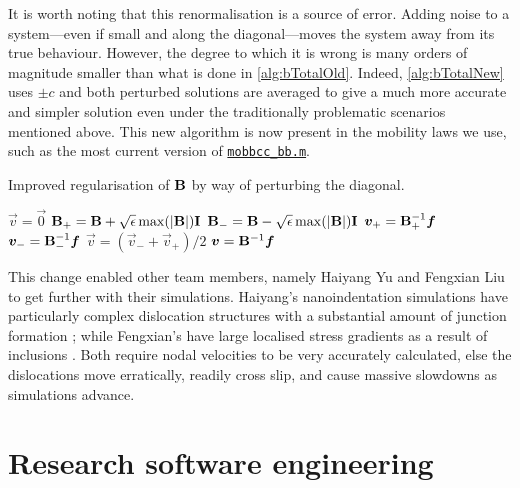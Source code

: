 It is worth noting that this renormalisation is a source of error. Adding noise to a system---even if small and along the diagonal---moves the system away from its true behaviour. However, the degree to which it is wrong is many orders of magnitude smaller than what is done in \cref{alg:bTotalOld}. Indeed, \cref{alg:bTotalNew} uses $\pm c $ and both perturbed solutions are averaged to give a much more accurate and simpler solution even under the traditionally problematic scenarios mentioned above. This new algorithm is now present in the mobility laws we use, such as the most current version of \href{https://github.com/TarletonGroup/EasyDD/blob/372984499dd60136fc7badabd6cee192058d55d9/src/mobbcc_bb1b.m#L199}{\texttt{mobbcc\_bb.m}}.
\begin{algorithm}
  \caption[Dampening the drag matrix inversion singularity.]{Improved regularisation of $\mathbf{B}$ by way of perturbing the diagonal.}
  \label{alg:bTotalNew}
  \begin{algorithmic}
    \State $\vec{v} = \vec{0}$
    \State $\mathbf{B}_+ = \mathbf{B} + \sqrt{\epsilon} \max(\mathbf{\lvert B\rvert}) \mathbf{I}$
    \State $\mathbf{B}_- = \mathbf{B} - \sqrt{\epsilon} \max(\mathbf{\lvert B\rvert}) \mathbf{I}$
    \State $\vec{v}_+ = \mtx{B}_+^{-1} \vec{f}$
    \State $\vec{v}_- = \mtx{B}_-^{-1} \vec{f}$
    \State $\vec{v} = (\vec{v}_- + \vec{v}_+)/2$
    \Else
    \State $\vec{v} = \mtx{B}^{-1} \vec{f}$
    \EndIf
  \end{algorithmic}
\end{algorithm}

This change enabled other team members, namely Haiyang Yu and Fengxian Liu to get further with their simulations. Haiyang's nanoindentation simulations have particularly complex dislocation structures with a substantial amount of junction formation \cite{YU2018,yu2020simulating,yu2019influence}; while Fengxian's have large localised stress gradients as a result of inclusions \cite{fengxian,fengxian2}. Both require nodal velocities to be very accurately calculated, else the dislocations move erratically, readily cross slip, and cause massive slowdowns as simulations advance.

\section{Research software engineering}
\label{s:rse}


